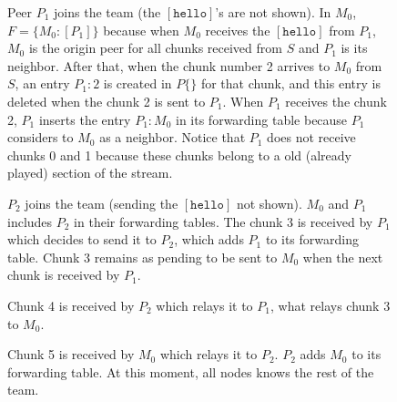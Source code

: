 \begin{figure}
   \caption{Peer $P_1$ joins the team (the
    $[\mathtt{hello}]$'s are not shown). In $M_0$, $F=\{M_0:[P_1]\}$
    because when $M_0$ receives the $[\mathtt{hello}]$ from $P_1$,
    $M_0$ is the origin peer for all chunks received from $S$ and
    $P_1$ is its neighbor. After that, when the chunk number 2 arrives
    to $M_0$ from $S$, an entry $P_1:2$ is created in $P\{\}$ for that
    chunk, and this entry is deleted when the chunk 2 is sent to
    $P_1$. When $P_1$ receives the chunk 2, $P_1$ inserts the entry
    $P_1:M_0$ in its forwarding table because $P_1$ considers to $M_0$
    as a neighbor. Notice that $P_1$ does not receive chunks 0 and 1
    because these chunks belong to a old (already played) section of
    the stream.\label{fig:team_1}}
\end{figure}

\begin{figure}
   \caption{$P_2$ joins the team (sending the
    $[\mathtt{hello}]$ not shown). $M_0$ and $P_1$ includes $P_2$ in
    their forwarding tables. The chunk 3 is received by $P_1$ which
    decides to send it to $P_2$, which adds $P_1$ to its forwarding
    table. Chunk 3 remains as pending to be sent to $M_0$ when the
    next chunk is received by $P_1$.\label{fig:team_2}}
\end{figure}

\begin{figure}
   \caption{Chunk 4 is received by $P_2$ which
    relays it to $P_1$, what relays chunk 3 to
    $M_0$.\label{fig:team_3}}
\end{figure}

\begin{figure}
   \caption{Chunk 5 is received by $M_0$ which
    relays it to $P_2$. $P_2$ adds $M_0$ to its forwarding table. At
    this moment, all nodes knows the rest of the
    team.\label{fig:team_4}}
\end{figure}

